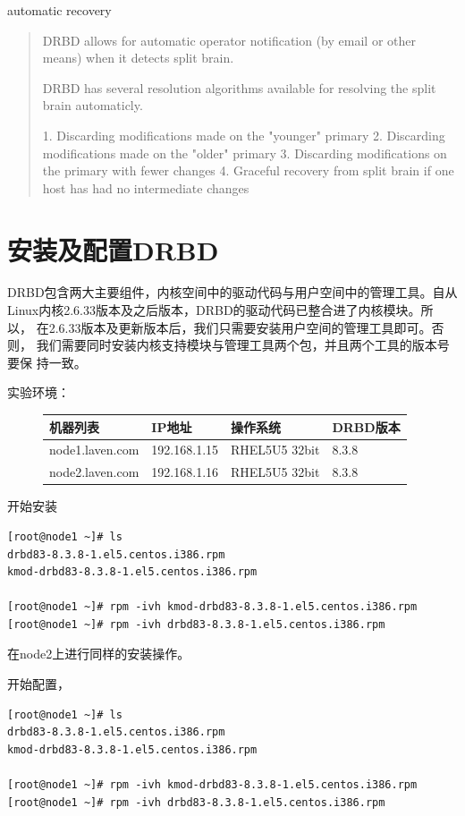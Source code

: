 automatic recovery
\begin{quote}
DRBD allows for automatic operator notification (by email or other
means) when it detects split brain.

DRBD has several resolution algorithms available for resolving the
split brain automaticly.

1. Discarding modifications made on the "younger" primary
2. Discarding modifications made on the "older" primary
3. Discarding modifications on the primary with fewer changes
4. Graceful recovery from split brain if one host has had no intermediate changes
\end{quote}

\section{安装及配置DRBD}

DRBD包含两大主要组件，内核空间中的驱动代码与用户空间中的管理工具。自从
Linux内核2.6.33版本及之后版本，DRBD的驱动代码已整合进了内核模块。所以，
在2.6.33版本及更新版本后，我们只需要安装用户空间的管理工具即可。否则，
我们需要同时安装内核支持模块与管理工具两个包，并且两个工具的版本号要保
持一致。

实验环境：

\begin{figure}[!h]
\centering
\begin{tabular}{llll}
\toprule
机器列表        & IP地址        & 操作系统       & DRBD版本 \\
\midrule
node1.laven.com & 192.168.1.15  & RHEL5U5 32bit  & 8.3.8 \\
node2.laven.com & 192.168.1.16  & RHEL5U5 32bit  & 8.3.8 \\
\bottomrule
\end{tabular}
\end{figure}


开始安装

\small{
\begin{verbatim}
[root@node1 ~]# ls
drbd83-8.3.8-1.el5.centos.i386.rpm
kmod-drbd83-8.3.8-1.el5.centos.i386.rpm

[root@node1 ~]# rpm -ivh kmod-drbd83-8.3.8-1.el5.centos.i386.rpm
[root@node1 ~]# rpm -ivh drbd83-8.3.8-1.el5.centos.i386.rpm
\end{verbatim}
}
\normalsize

在node2上进行同样的安装操作。

开始配置，

\small{
\begin{verbatim}
[root@node1 ~]# ls
drbd83-8.3.8-1.el5.centos.i386.rpm
kmod-drbd83-8.3.8-1.el5.centos.i386.rpm

[root@node1 ~]# rpm -ivh kmod-drbd83-8.3.8-1.el5.centos.i386.rpm
[root@node1 ~]# rpm -ivh drbd83-8.3.8-1.el5.centos.i386.rpm
\end{verbatim}
}
\normalsize

